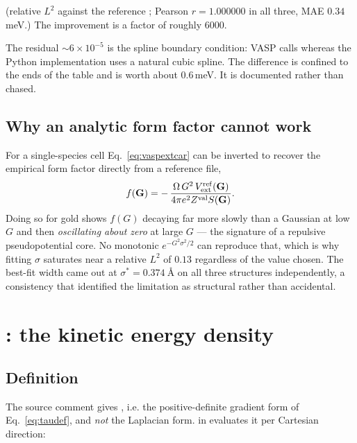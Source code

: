 (relative $L^2$ against the reference ; Pearson $r = 1.000000$ in
all three, MAE $0.34$\,meV.) The improvement is a factor of roughly $6000$.

\begin{pwarn}
The residual $\sim6\times10^{-5}$ is the spline boundary condition: VASP calls
 whereas the Python implementation
uses a natural cubic spline. The difference is confined to the ends of the
table and is worth about $0.6$\,meV. It is documented rather than chased.
\end{pwarn}

\subsection{Why an analytic form factor cannot work}

For a single-species cell Eq.~\eqref{eq:vaspextcar} can be inverted to recover
the empirical form factor directly from a reference file,
\begin{equation}
  f(\mathbf{G}) = -\,\frac{\Omega\,G^2\,V_{\mathrm{ext}}^{\mathrm{ref}}(\mathbf{G})}
                   {4\pi e^2 Z^{\mathrm{val}} S(\mathbf{G})} .
\end{equation}
Doing so for gold shows $f(G)$ decaying far more slowly than a Gaussian at low
$G$ and then \emph{oscillating about zero} at large $G$ --- the signature of a
repulsive pseudopotential core. No monotonic $e^{-G^2\sigma^2/2}$ can reproduce
that, which is why fitting $\sigma$ saturates near a relative $L^2$ of $0.13$
regardless of the value chosen. The best-fit width came out at
$\sigma^{*}=0.374\ \text{\AA}$ on all three structures independently, a
consistency that identified the limitation as structural rather than accidental.

\section{\texorpdfstring{}{TAUCAR}: the kinetic energy density}

\subsection{Definition}

The source comment gives
,
i.e. the positive-definite gradient form of Eq.~\eqref{eq:taudef}, and
\emph{not} the Laplacian form.  in  evaluates it
per Cartesian direction:

